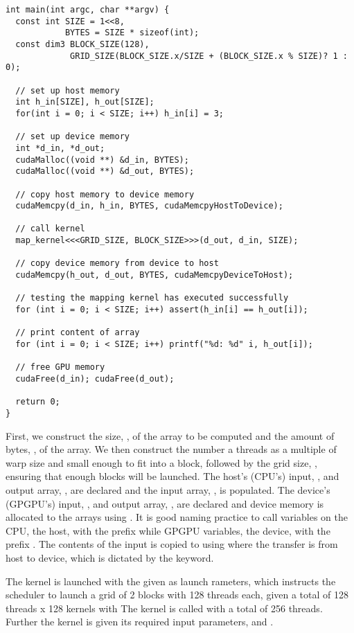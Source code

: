 \begin{lstlisting}[caption={Calling a kernel}, label={lst:kernel call example}]
int main(int argc, char **argv) {
  const int SIZE = 1<<8,
            BYTES = SIZE * sizeof(int);
  const dim3 BLOCK_SIZE(128),
             GRID_SIZE(BLOCK_SIZE.x/SIZE + (BLOCK_SIZE.x % SIZE)? 1 : 0);

  // set up host memory
  int h_in[SIZE], h_out[SIZE];
  for(int i = 0; i < SIZE; i++) h_in[i] = 3;

  // set up device memory
  int *d_in, *d_out;
  cudaMalloc((void **) &d_in, BYTES);
  cudaMalloc((void **) &d_out, BYTES);

  // copy host memory to device memory
  cudaMemcpy(d_in, h_in, BYTES, cudaMemcpyHostToDevice);

  // call kernel
  map_kernel<<<GRID_SIZE, BLOCK_SIZE>>>(d_out, d_in, SIZE);

  // copy device memory from device to host
  cudaMemcpy(h_out, d_out, BYTES, cudaMemcpyDeviceToHost);

  // testing the mapping kernel has executed successfully
  for (int i = 0; i < SIZE; i++) assert(h_in[i] == h_out[i]);

  // print content of array
  for (int i = 0; i < SIZE; i++) printf("%d: %d" i, h_out[i]);

  // free GPU memory
  cudaFree(d_in); cudaFree(d_out);

  return 0;
}
\end{lstlisting}

First, we construct the size, , of the array to be computed and the amount of bytes, , of the array.
We then construct the number a threads as a multiple of warp size and small enough to fit into a block, followed by the grid size, , ensuring that enough blocks will be launched.
The host's (CPU's) input, , and output array, , are declared and the input array, , is populated.
The device's (GPGPU's) input, , and output array, , are declared and device memory is allocated to the arrays using .
It is good naming practice to call variables on the CPU, the host, with the prefix  while GPGPU variables, the device, with the prefix .
The contents of the input is copied to  using  where the transfer is from host to device, which is dictated by the  keyword.

The kernel is launched with the  given as launch rameters, which instructs the scheduler to launch a grid of 2 blocks with 128 threads each, given a total of 128 threads x 128 kernels with The kernel is called with a total of 256 threads.
Further the kernel is given its required input parameters,  and .


